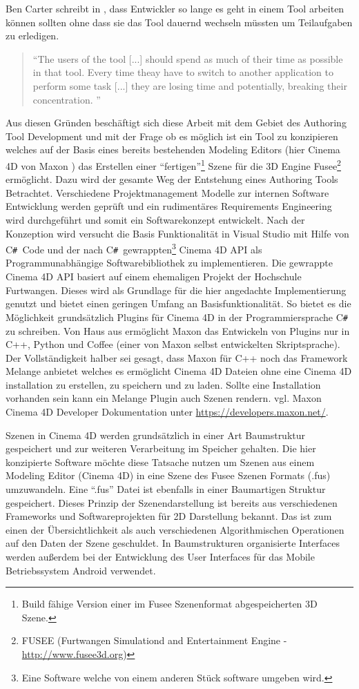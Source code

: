 \documentclass[pagesize, paper=a4, fontsize=12pt,titlepage=true, headings=small, headnosepline, abstractoff, liststotoc, nochapterprefix, plainheadsepline, twoside]{scrreprt}
\newcommand{\CSS}{C\texttt{\# }}
\begin{document}
Ben Carter schreibt in , dass Entwickler so lange es geht in einem Tool arbeiten können sollten ohne dass sie das Tool dauernd wechseln müssten um Teilaufgaben zu erledigen.
\begin{quote}
“The users of the tool [...] should spend as much of their time as possible in that tool. Every time theay have to switch to another application to perform some task [...] they are losing time and potentially, breaking their concentration. \cite[S. 18]{Carter2004}”
\end{quote}
Aus diesen Gründen beschäftigt sich diese Arbeit mit dem Gebiet des Authoring Tool Development und mit der Frage ob es möglich ist ein Tool zu konzipieren welches auf der Basis eines bereits bestehenden Modeling Editors (hier Cinema 4D von Maxon ) das Erstellen einer “fertigen”\footnote{Build fähige Version einer im Fusee Szenenformat abgespeicherten 3D Szene.} Szene für die 3D Engine Fusee\footnote{FUSEE (Furtwangen Simulationd and Entertainment Engine - \url{http://www.fusee3d.org})} ermöglicht. Dazu wird der gesamte Weg der Entstehung eines Authoring Tools Betrachtet. Verschiedene Projektmanagement Modelle zur internen Software Entwicklung werden geprüft und ein rudimentäres Requirements Engineering wird durchgeführt und somit ein Softwarekonzept entwickelt. Nach der Konzeption wird versucht die Basis Funktionalität in Visual Studio mit Hilfe von \CSS Code und der nach \CSS gewrappten\footnote{Eine Software welche von einem anderen Stück software umgeben wird.} Cinema 4D API als Programmunabhängige Softwarebibliothek zu implementieren. Die gewrappte Cinema 4D API basiert auf einem ehemaligen Projekt der Hochschule Furtwangen. Dieses wird als Grundlage für die hier angedachte Implementierung genutzt und bietet einen geringen Umfang an Basisfunktionalität. So bietet es die Möglichkeit grundsätzlich Plugins für Cinema 4D in der Programmiersprache \CSS zu schreiben. Von Haus aus ermöglicht Maxon das Entwickeln von Plugins nur in C++, Python und Coffee (einer von Maxon selbst entwickelten Skriptsprache). Der Vollständigkeit halber sei gesagt, dass Maxon für C++ noch das Framework Melange anbietet welches es ermöglicht Cinema 4D Dateien ohne eine Cinema 4D installation zu erstellen, zu speichern und zu laden. Sollte eine Installation vorhanden sein kann ein Melange Plugin auch Szenen rendern. vgl. Maxon Cinema 4D Developer Dokumentation unter \url{https://developers.maxon.net/}.

Szenen in Cinema 4D werden grundsätzlich in einer Art Baumstruktur gespeichert und zur weiteren Verarbeitung im Speicher gehalten. Die hier konzipierte Software möchte diese Tatsache nutzen um Szenen aus einem Modeling Editor (Cinema 4D) in eine Szene des Fusee Szenen Formats (.fus) umzuwandeln. Eine “.fus” Datei ist ebenfalls in einer Baumartigen Struktur gespeichert. Dieses Prinzip der Szenendarstellung ist bereits aus verschiedenen Frameworks und Softwareprojekten für 2D Darstellung bekannt. Das ist zum einen der Übersichtlichkeit als auch verschiedenen Algorithmischen Operationen auf den Daten der Szene geschuldet. In Baumstrukturen organisierte Interfaces werden außerdem bei der Entwicklung des User Interfaces für das Mobile Betriebssystem Android verwendet.
\end{document}
